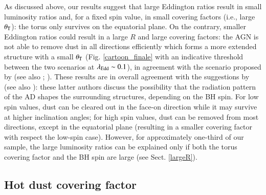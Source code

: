 \documentclass[]{aa}
\begin{document}
As discussed above, our results suggest that large Eddington ratios result in small luminosity ratios and, for a fixed spin value, in small covering factors (i.e., large $\theta_{\rm T}$): the torus only survives on the equatorial plane. On the contrary, smaller Eddington ratios could result in a large $R$ and large covering factors: the AGN is not able to remove dust in all directions efficiently which forms a more extended structure with a small $\theta_{\rm T}$ (Fig. \ref{cartoon_finale} with an indicative threshold between the two scenarios at $\lambda_{\rm Edd} \sim 0.1$), in agreement with the scenario proposed by \citet{Ricci} (see also \citealt{Kawaka}; \citealt{Lyu2017}). These results are in overall agreement with the suggestions by \citet{Ishi} (see also \citealt{Ishi20}): these latter authors discuss the possibility that the radiation pattern of the AD shapes the surrounding structures, depending on the BH spin. For low spin values, dust can be cleared out in the face-on direction while it may survive at higher inclination angles; for high spin values, dust can be removed from most directions, except in the equatorial plane (resulting in a smaller covering factor with respect the low-spin case). However, for approximately one-third of our sample, the large luminosity ratios can be explained only if both the torus covering factor and the BH spin are large (see Sect. \ref{largeR}).





\subsection{Hot dust covering factor}
\end{document}
